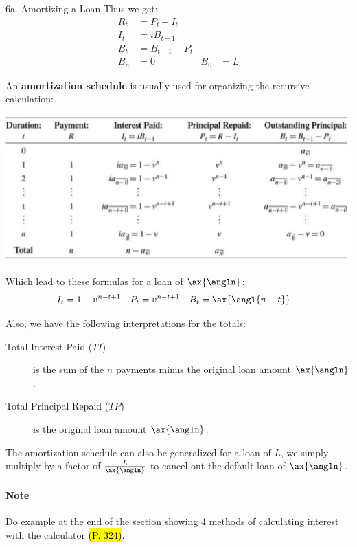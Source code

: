 \begin{CHPT_SUMM_AUTO}[label = {L.-6a}]{6a. Amortizing a Loan}
Thus we get:
\begin{align*}
	R_{t}	&= P_{t} + I_{t}	\\
	I_{t}	&= iB_{t - 1}	\\
	B_{t} 	&= B_{t - 1} - P_{t}	\\
	B_{n}	&=	0	&
	B_{0}	&=	L
\end{align*}

An \textbf{amortization schedule} is usually used for organizing the recursive calculation:
\begin{center}
	\includegraphics[scale=0.35]{img/amortization-schedule.png}
\end{center}

Which lead to these formulas for a loan of $\ax{\angln}$:
\begin{align*}
	I_{t}	&=	1 - v^{n - t + 1}	&
	P_{t}	&=	v^{n - t + 1}	&
	B_{t}	&=	\ax{\angl{n - t}}
\end{align*}

Also, we have the following interpretations for the totals:
\begin{description}
	\item[Total Interest Paid ($TI$)]	is the sum of the $n$ payments minus the original loan amount $\ax{\angln}$.
	\item[Total Principal Repaid ($TP$)]	is the original loan amount $\ax{\angln}$.
\end{description}

The amortization schedule can also be generalized for a loan of $L$, we simply multiply by a factor of $\frac{L}{\ax{\angln}}$ to cancel out the default loan of $\ax{\angln}$.\\

\paragraph{Note}	Do example at the end of the section showing 4 methods of calculating interest with the calculator \hl{(P. 324)}.
\end{CHPT_SUMM_AUTO}

